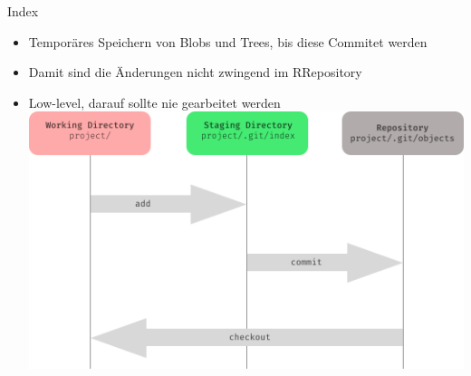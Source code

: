 \begin{frame}{Index}
  \begin{itemize}
    \item Temporäres Speichern von Blobs und Trees, bis diese Commitet werden
    \pause
    \item Damit sind die Änderungen nicht zwingend im RRepository
    \pause
    \item Low-level, darauf sollte nie gearbeitet werden
    \pause
    \href{https://hackernoon.com/understanding-git-index-4821a0765cf}{\includegraphics[scale=0.25]{./section/pictures/index.png}}
  \end{itemize}

\end{frame}
